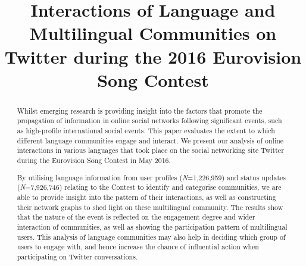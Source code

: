\documentclass[conference]{IEEEtran}
\begin{document}
\title{Interactions of Language and Multilingual Communities on
  Twitter during the 2016 Eurovision Song Contest}


\author{
\and
{}
\and
{}
}



\maketitle


\begin{abstract}
Whilst emerging research is providing insight into the factors that
promote the propagation of information in online social networks
following significant events, such as high-profile international
social events. This paper evaluates the extent to which different
language communities engage and interact. We present our analysis of
online interactions in various languages that took place on the social
networking site Twitter during the Eurovision Song Contest in May
2016.

By utilising language information from user profiles
({\emph{N}}=1,226,959) and status updates ({\emph{N}}=7,926,746)
relating to the Contest to identify and categorise communities, we are
able to provide insight into the pattern of their interactions, as
well as constructing their network graphs to shed light on these
multilingual community. The results show that the nature of the event
is reflected on the engagement degree and wider interaction of
communities, as well as showing the participation pattern of
multilingual users. This analysis of language communities may also
help in deciding which group of users to engage with, and hence
increase the chance of influential action when participating on
Twitter conversations.
\end{abstract}
\end{document}
